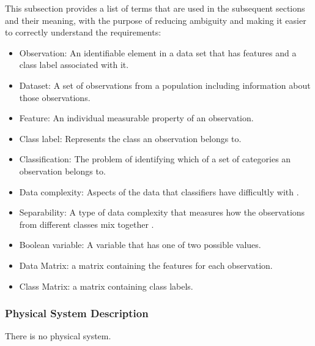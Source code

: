 \documentclass[12pt]{article}
\begin{document}

This subsection provides a list of terms that are used in the subsequent
sections and their meaning, with the purpose of reducing ambiguity and making it
easier to correctly understand the requirements:

\begin{itemize}
\item Observation: An identifiable element in a data set that has features and a class label associated with it.
\item Dataset: A set of observations from a population including information about those observations.
\item Feature: An individual measurable property of an observation.
\item Class label: Represents the class an observation belongs to.
\item Classification: The problem of identifying which of a set of categories an observation belongs to.
\item Data complexity: Aspects of the data that classifiers have difficultly with \cite{luengo_automatic_2015}.
\item Separability: A type of data complexity that measures how the observations from different classes mix together \cite{guan_novel_2021}.
\item Boolean variable: A variable that has one of two possible values.
\item Data Matrix: a matrix containing the features for each observation.
\item Class Matrix: a matrix containing class labels.
\end{itemize}

\subsubsection{Physical System Description} \label{sec:phySystDescrip}

There is no physical system.
\end{document}
